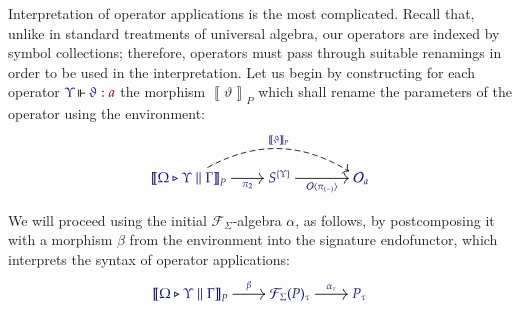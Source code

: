 \documentclass[11pt]{article}
\theoremstyle{definition}
\theoremstyle{remark}
\numberwithin{equation}{section}
\def\IModeColorName{MidnightBlue}
\def\OModeColorName{Maroon}
\newcommand\IMode[1]{{\color{\IModeColorName}{#1}}}
\newcommand\OMode[1]{{\color{\OModeColorName}{#1}}}
\newcommand\Operators{\mathcal{O}}
\newcommand\IsOperator[3]{
  \IMode{#1}\,{\Vdash}\,\IMode{#2}: \OMode{#3}
}
\newcommand\FLift[2]{
  \Operators\langle#1%
  \ifthenelse{\equal{#2}{}}{}{, #2}\rangle%
}
\newcommand\SigFun[1]{\mathcal{F}_{#1}}
\newcommand\SemBrackets[1]{\left\llbracket#1\right\rrbracket}
\begin{document}
Interpretation of operator applications is the most complicated. Recall that,
unlike in standard treatments of universal algebra, our operators are indexed by
symbol collections; therefore, operators must pass through suitable renamings in
order to be used in the interpretation. Let us begin by constructing for each
operator $\IsOperator{\Upsilon}{\vartheta}{a}$ the morphism
$\SemBrackets{\vartheta}_P$ which shall rename the parameters of the operator
using the environment:
\[
  \begin{tikzcd}[cramped, ampersand replacement = \&]
    |[alias = Src]|
    {\IMode{\SemBrackets{\Omega\triangleright\Upsilon\parallel\Gamma}_P}}
      \arrow[r, swap, "\IMode{\pi_2}"]
    \&
    {\IMode{S^{\{\Upsilon\}}}}
      \arrow[r, swap, "\IMode{\FLift{\pi_{(-)}}{}}"]
    \&[1.5em]
    |[alias = Tgt]|
    {\IMode{\Operators_a}}
    \arrow[from = Src, to = Tgt, bend left, dashed, "\IMode{\SemBrackets{\vartheta}_{P}}"]
  \end{tikzcd}
\]

We will proceed using the initial $\SigFun{\Sigma}$-algebra $\alpha$, as
follows, by postcomposing it with a morphism $\beta$ from the environment into
the signature endofunctor, which interprets the syntax of operator
applications:
\[
   \begin{tikzcd}[cramped, ampersand replacement = \&]
     {\IMode{\SemBrackets{\Omega\triangleright\Upsilon\parallel\Gamma}_P}} \arrow[r, "\IMode{\beta}"]
     \& {\IMode{\SigFun{\Sigma}(P)_\tau}} \arrow[r, "\IMode{\alpha_\tau}"]
     \& {\IMode{P_\tau}}
   \end{tikzcd}
\]
\end{document}
